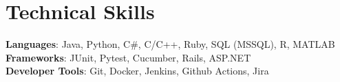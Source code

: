 \documentclass[letterpaper,11pt]{article}
\begin{document}
\section{Technical Skills}
 \begin{itemize}[leftmargin=0.15in, label={}]
    \small{\item{
     \textbf{Languages}{: Java, Python, C\#, C/C++, Ruby, SQL (MSSQL), R, MATLAB} \\
     \textbf{Frameworks}{: JUnit, Pytest, Cucumber, Rails, ASP.NET} \\
     \textbf{Developer Tools}{: Git, Docker, Jenkins, Github Actions, Jira} \\
    }}
 \end{itemize}


\end{document}
